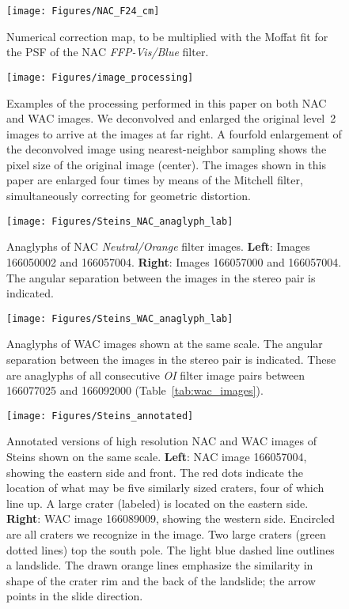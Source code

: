 \documentclass[preprint,3p,authoryear]{elsarticle}
\begin{document}
\newpage
\clearpage

\begin{figure}
\centering
\texttt{[image: Figures/NAC\_F24\_cm]}
\caption{Numerical correction map, to be multiplied with the Moffat fit for the PSF of the NAC {\it FFP-Vis/Blue} filter.}
\label{fig:psf_cor_map}
\end{figure}


\begin{figure}
\centering
\texttt{[image: Figures/image\_processing]}
\caption{Examples of the processing performed in this paper on both NAC and WAC images. We deconvolved and enlarged the original level~2 images to arrive at the images at far right. A fourfold enlargement of the deconvolved image using nearest-neighbor sampling shows the pixel size of the original image (center). The images shown in this paper are enlarged four times by means of the Mitchell filter, simultaneously correcting for geometric distortion.}
\label{fig:image_proc}
\end{figure}


\begin{figure}
\centering
\texttt{[image: Figures/Steins\_NAC\_anaglyph\_lab]}
\caption{Anaglyphs of NAC {\it Neutral/Orange} filter images. {\bf Left}: Images 166050002 and 166057004. {\bf Right}: Images 166057000 and 166057004. The angular separation between the images in the stereo pair is indicated.}
\label{fig:nac_anaglyphs}
\end{figure}


\begin{figure}
\centering
\texttt{[image: Figures/Steins\_WAC\_anaglyph\_lab]}
\caption{Anaglyphs of WAC images shown at the same scale. The angular separation between the images in the stereo pair is indicated. These are anaglyphs of all consecutive {\it OI} filter image pairs between 166077025 and 166092000 (Table~\ref{tab:wac_images}).}
\label{fig:wac_anaglyphs}
\end{figure}


\begin{figure}
\centering
\texttt{[image: Figures/Steins\_annotated]}
\caption{Annotated versions of high resolution NAC and WAC images of Steins shown on the same scale. {\bf Left}: NAC image 166057004, showing the eastern side and front. The red dots indicate the location of what may be five similarly sized craters, four of which line up. A large crater (labeled) is located on the eastern side. {\bf Right}: WAC image 166089009, showing the western side. Encircled are all craters we recognize in the image. Two large craters (green dotted lines) top the south pole. The light blue dashed line outlines a landslide. The drawn orange lines emphasize the similarity in shape of the crater rim and the back of the landslide; the arrow points in the slide direction.}
\label{fig:annotated}
\end{figure}
\end{document}
